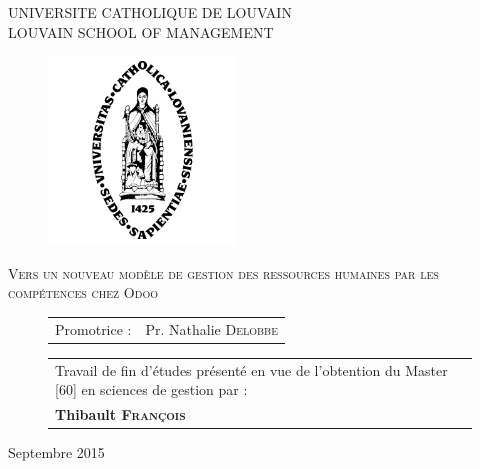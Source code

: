 \parindent=0cm



\begin{center}
{\large    UNIVERSITE CATHOLIQUE DE LOUVAIN \\
LOUVAIN SCHOOL OF MANAGEMENT \\
}
   \end{center}
\vfill

 \begin{figure}[H]
\begin{center}  \hspace*{-10mm} 
	\includegraphics[height = 5cm]{alma.png}
   \end{center}
\end{figure}


\vfill


\begin{center}
{\Large \textsc{Vers un nouveau modèle de gestion des ressources humaines par les compétences chez Odoo}}
\end{center}



\vfill

 \begin{figure}[H]
 \begin{minipage}[c]{.45\linewidth}
		\begin{tabular}{ll}
		Promotrice : & Pr. Nathalie \textsc{Delobbe} \\

		\end{tabular}
\end{minipage} \hfill
 \begin{minipage}[c]{.45\linewidth}
 \begin{tabularx}{\linewidth}{p{\textwidth}}
Travail de fin d'études présenté en vue de \hbox{l'obtention} du Master [60] en sciences de gestion par :\\
\textbf{Thibault \textsc{François}}

\end{tabularx}
\end{minipage}
\end{figure}

\vspace{1,5cm}



\begin{center}
{\large Septembre 2015}
\end{center}
